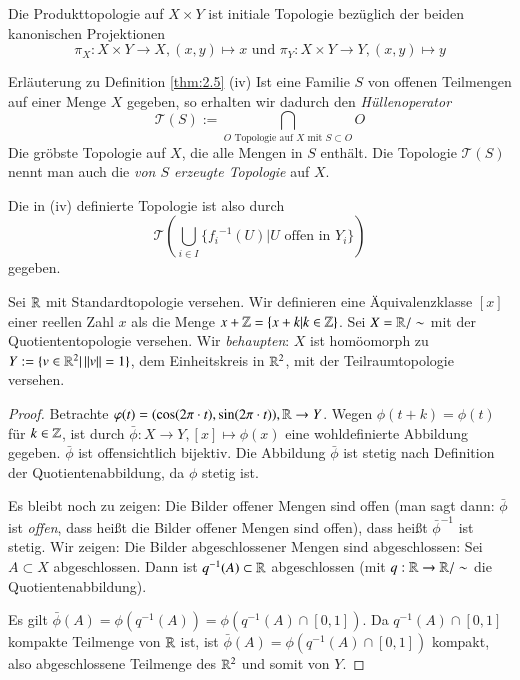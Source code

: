 \documentclass[a4paper,10pt]{scrartcl}
\begin{document}
\begin{ex*}
Die Produkttopologie auf $ X\times Y $ ist initiale Topologie bezüglich der beiden kanonischen Projektionen
\[
\pi_X:X\times Y \to X, (x,y)\mapsto x \text{ und } \pi_Y: X\times Y\to Y, (x,y)\mapsto y 
\]
\end{ex*}
\begin{seg}{Erläuterung zu Definition \ref{thm:2.5} (iv)} 
Ist eine Familie $ S $ von offenen Teilmengen auf einer Menge $ X $ gegeben, so erhalten wir dadurch den \emph{Hüllenoperator} 
\[ 
\mathcal T(S):=\bigcap\limits_{ O \text{ Topologie auf } X \text{ mit } S\subset O} O 
\]
Die gröbste Topologie auf $ X $, die alle Mengen in $ S $ enthält. Die Topologie $ \mathcal T(S) $ nennt man auch die \emph{von $ S $ erzeugte Topologie} auf $ X $.
\end{seg}
Die in (iv) definierte Topologie ist also durch
\[
\mathcal T(\bigcup\limits_{i\in I} \{ {f_i}^{-1}(U)|U \text{ offen in } Y_i\} )
\]
gegeben.
\begin{ex}\label{thm:2.6} Sei $ \mathbb{R} $ mit Standardtopologie versehen. Wir definieren eine Äquivalenzklasse $ [x] $ einer reellen Zahl $ x $ als die Menge $x+\mathbb{Z}=\{x+k|k\in \mathbb{Z}\}$. Sei $ X=\mathbb{R}/\sim $ mit der Quotiententopologie versehen. Wir \emph{behaupten}: $ X $ ist homöomorph zu $ Y:=\{v\in \mathbb{R}^2|\, ||v||=1\} $, dem Einheitskreis in $ \mathbb{R}^2 $, mit der Teilraumtopologie versehen. 
\begin{figure}[H]
\centering
 \fixme[fig12]
\caption{}
\end{figure}
\begin{proof}
Betrachte $ \varphi(t)=(\cos(2\pi\cdot t),\sin(2\pi \cdot t)), \mathbb{R}\to Y $.
Wegen $ \phi(t+k)=\phi(t) $ für $ k\in \mathbb{Z} $, ist durch $ \bar\phi: X\to Y, [x]\mapsto \phi(x) $ eine wohldefinierte Abbildung gegeben. $\bar \phi$ ist offensichtlich bijektiv. Die Abbildung $ \bar \phi  $ ist stetig nach Definition der Quotientenabbildung, da $ \phi $ stetig ist.

Es bleibt noch zu zeigen: Die Bilder offener Mengen sind offen (man sagt dann: $ \bar \phi $ ist \emph{offen}, dass heißt die Bilder offener Mengen sind offen), dass heißt $ \bar \phi^{-1} $ ist stetig. Wir zeigen: Die Bilder abgeschlossener Mengen sind abgeschlossen: Sei $ A\subset X $ abgeschlossen. Dann ist $ q^{-1}(A)\subset \mathbb{R} $ abgeschlossen (mit $ q: \mathbb{R} \to \mathbb{R}/\sim $ die Quotientenabbildung).

Es gilt $ \bar \phi(A)=\phi(q^{-1}(A))=\phi(q^{-1}(A)\cap[0,1]) $. Da $ q^{-1}(A)\cap [0,1] $ kompakte Teilmenge von $ \mathbb{R} $ ist, ist $ \bar\phi(A)=\phi(q^{-1}(A)\cap[0,1]) $ kompakt, also abgeschlossene Teilmenge des $ \mathbb{R}^2  $ und somit von $ Y $.
\end{proof}
\end{ex}
\end{document}

